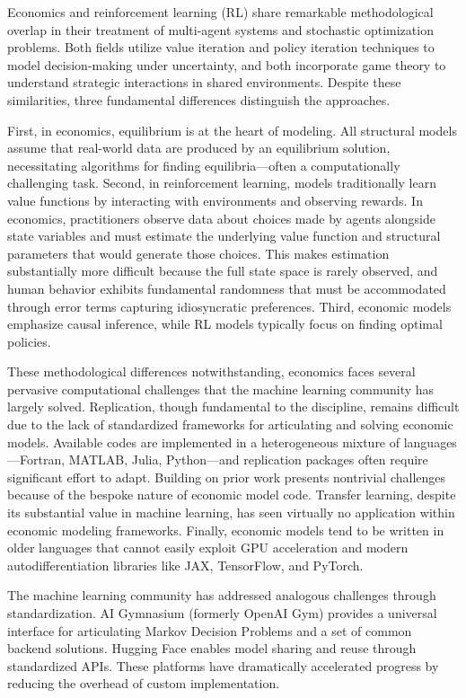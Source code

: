 \documentclass[12pt]{article}
\begin{document}
Economics and reinforcement learning (RL) share remarkable methodological overlap in their treatment of multi-agent systems and stochastic optimization problems. Both fields utilize value iteration and policy iteration techniques to model decision-making under uncertainty, and both incorporate game theory to understand strategic interactions in shared environments. Despite these similarities, three fundamental differences distinguish the approaches.

First, in economics, equilibrium is at the heart of modeling. All structural models assume that real-world data are produced by an equilibrium solution, necessitating algorithms for finding equilibria---often a computationally challenging task. Second, in reinforcement learning, models traditionally learn value functions by interacting with environments and observing rewards. In economics, practitioners observe data about choices made by agents alongside state variables and must estimate the underlying value function and structural parameters that would generate those choices. This makes estimation substantially more difficult because the full state space is rarely observed, and human behavior exhibits fundamental randomness that must be accommodated through error terms capturing idiosyncratic preferences. Third, economic models emphasize causal inference, while RL models typically focus on finding optimal policies.

These methodological differences notwithstanding, economics faces several pervasive computational challenges that the machine learning community has largely solved. Replication, though fundamental to the discipline, remains difficult due to the lack of standardized frameworks for articulating and solving economic models. Available codes are implemented in a heterogeneous mixture of languages---Fortran, MATLAB, Julia, Python---and replication packages often require significant effort to adapt. Building on prior work presents nontrivial challenges because of the bespoke nature of economic model code. Transfer learning, despite its substantial value in machine learning, has seen virtually no application within economic modeling frameworks. Finally, economic models tend to be written in older languages that cannot easily exploit GPU acceleration and modern autodifferentiation libraries like JAX, TensorFlow, and PyTorch.

The machine learning community has addressed analogous challenges through standardization. AI Gymnasium (formerly OpenAI Gym) provides a universal interface for articulating Markov Decision Problems and a set of common backend solutions. Hugging Face enables model sharing and reuse through standardized APIs. These platforms have dramatically accelerated progress by reducing the overhead of custom implementation.
\end{document}
